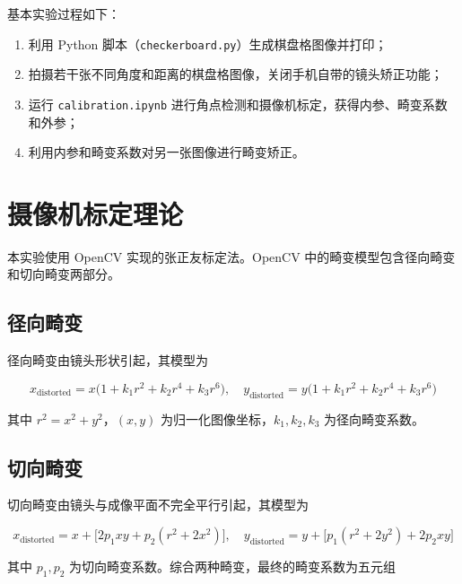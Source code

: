 \documentclass[12pt,a4paper]{ctexart}
\begin{document}
基本实验过程如下：

\begin{enumerate}
  \item 利用 Python 脚本（\texttt{checkerboard.py}）生成棋盘格图像并打印；
  \item 拍摄若干张不同角度和距离的棋盘格图像，关闭手机自带的镜头矫正功能；
  \item 运行 \texttt{calibration.ipynb} 进行角点检测和摄像机标定，获得内参、畸变系数和外参；
  \item 利用内参和畸变系数对另一张图像进行畸变矫正。
\end{enumerate}

\section{摄像机标定理论}

本实验使用 OpenCV 实现的张正友标定法。OpenCV 中的畸变模型包含径向畸变和切向畸变两部分。

\subsection{径向畸变}

径向畸变由镜头形状引起，其模型为

\begin{equation}
  x_\text{distorted} = x\bigl(1 + k_1 r^2 + k_2 r^4 + k_3 r^6\bigr), \quad
  y_\text{distorted} = y\bigl(1 + k_1 r^2 + k_2 r^4 + k_3 r^6\bigr)
\end{equation}

其中 $r^2 = x^2 + y^2$，$(x, y)$ 为归一化图像坐标，$k_1, k_2, k_3$ 为径向畸变系数。

\subsection{切向畸变}

切向畸变由镜头与成像平面不完全平行引起，其模型为

\begin{equation}
  x_\text{distorted} = x + \bigl[2p_1 xy + p_2(r^2 + 2x^2)\bigr], \quad
  y_\text{distorted} = y + \bigl[p_1(r^2 + 2y^2) + 2p_2 xy\bigr]
\end{equation}

其中 $p_1, p_2$ 为切向畸变系数。综合两种畸变，最终的畸变系数为五元组
\end{document}
